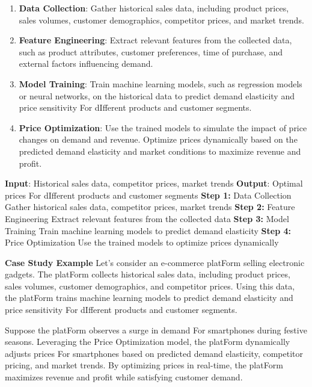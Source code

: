 \documentclass[12pt]{book} %
\begin{document}
\begin{enumerate}
    \item \textbf{Data Collection}: Gather historical sales data, including product prices, sales volumes, customer demographics, competitor prices, and market trends.
    \item \textbf{Feature Engineering}: Extract relevant features from the collected data, such as product attributes, customer preferences, time of purchase, and external factors influencing demand.
    \item \textbf{Model Training}: Train machine learning models, such as regression models or neural networks, on the historical data to predict demand elasticity and price sensitivity For dIfferent products and customer segments.
    \item \textbf{Price Optimization}: Use the trained models to simulate the impact of price changes on demand and revenue. Optimize prices dynamically based on the predicted demand elasticity and market conditions to maximize revenue and profit.
\end{enumerate}
\FloatBarrier
\begin{algorithm}
\caption{Price Optimization Algorithm}
\begin{algorithmic}[1]
\State \textbf{Input}: Historical sales data, competitor prices, market trends
\State \textbf{Output}: Optimal prices For dIfferent products and customer segments
\State \textbf{Step 1:} Data Collection
\State Gather historical sales data, competitor prices, market trends
\State \textbf{Step 2:} Feature Engineering
\State Extract relevant features from the collected data
\State \textbf{Step 3:} Model Training
\State Train machine learning models to predict demand elasticity
\State \textbf{Step 4:} Price Optimization
\State Use the trained models to optimize prices dynamically
\EndProcedure
\end{algorithmic}
\end{algorithm}
\FloatBarrier
\textbf{Case Study Example}
Let's consider an e-commerce platForm selling electronic gadgets. The platForm collects historical sales data, including product prices, sales volumes, customer demographics, and competitor prices. Using this data, the platForm trains machine learning models to predict demand elasticity and price sensitivity For dIfferent products and customer segments.

Suppose the platForm observes a surge in demand For smartphones during festive seasons. Leveraging the Price Optimization model, the platForm dynamically adjusts prices For smartphones based on predicted demand elasticity, competitor pricing, and market trends. By optimizing prices in real-time, the platForm maximizes revenue and profit while satisfying customer demand.
\end{document}
